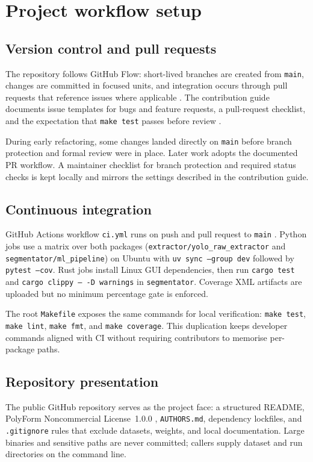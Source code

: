 \section{Project workflow setup}
\label{sec:workflow}

\subsection{Version control and pull requests}

The repository follows GitHub Flow: short-lived branches are created from \texttt{main}, changes are committed in focused units, and integration occurs through pull requests that reference issues where applicable \cite{GitHubFlow}. The contribution guide documents issue templates for bugs and feature requests, a pull-request checklist, and the expectation that \texttt{make test} passes before review \cite{ContributingGDPR}.

During early refactoring, some changes landed directly on \texttt{main} before branch protection and formal review were in place. Later work adopts the documented PR workflow. A maintainer checklist for branch protection and required status checks is kept locally and mirrors the settings described in the contribution guide.

\subsection{Continuous integration}

GitHub Actions workflow \texttt{ci.yml} runs on push and pull request to \texttt{main} \cite{CIGDPR}. Python jobs use a matrix over both packages (\texttt{extractor/yolo\_raw\_extractor} and \texttt{segmentator/ml\_pipeline}) on Ubuntu with \texttt{uv sync --group dev} followed by \texttt{pytest --cov}. Rust jobs install Linux GUI dependencies, then run \texttt{cargo test} and \texttt{cargo clippy -- -D warnings} in \texttt{segmentator}. Coverage XML artifacts are uploaded but no minimum percentage gate is enforced.

The root \texttt{Makefile} exposes the same commands for local verification: \texttt{make test}, \texttt{make lint}, \texttt{make fmt}, and \texttt{make coverage}. This duplication keeps developer commands aligned with CI without requiring contributors to memorise per-package paths.

\subsection{Repository presentation}

The public GitHub repository serves as the project face: a structured README, PolyForm Noncommercial License~1.0.0 \cite{PolyFormNC}, \texttt{AUTHORS.md}, dependency lockfiles, and \texttt{.gitignore} rules that exclude datasets, weights, and local documentation. Large binaries and sensitive paths are never committed; callers supply dataset and run directories on the command line.
